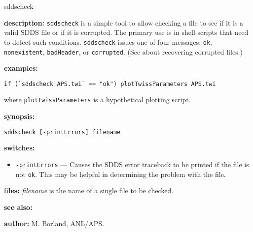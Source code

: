 \begin{sddsprog}{sddscheck}
  \item \textbf{description:} \verb|sddscheck| is a simple tool to allow checking a file to see if it is a valid SDDS file or if it is corrupted. The primary use is in shell scripts that need to detect such conditions. \verb|sddscheck| issues one of four messages: \verb|ok|, \verb|nonexistent|, \verb|badHeader|, or \verb|corrupted|. (See  about recovering corrupted files.)
  \item \textbf{examples:}
    \begin{verbatim}
if (`sddscheck APS.twi` == "ok") plotTwissParameters APS.twi
    \end{verbatim}
    where \verb|plotTwissParameters| is a hypothetical plotting script.
  \item \textbf{synopsis:}
    \begin{verbatim}
sddscheck [-printErrors] filename
    \end{verbatim}
  \item \textbf{switches:}
    \begin{itemize}
      \item \verb|-printErrors| --- Causes the SDDS error traceback to be printed if the file is not \verb|ok|. This may be helpful in determining the problem with the file.
    \end{itemize}
  \item \textbf{files:} \emph{filename} is the name of a single file to be checked.
  \item \textbf{see also:} 
  \item \textbf{author:} M. Borland, ANL/APS.
\end{sddsprog}

